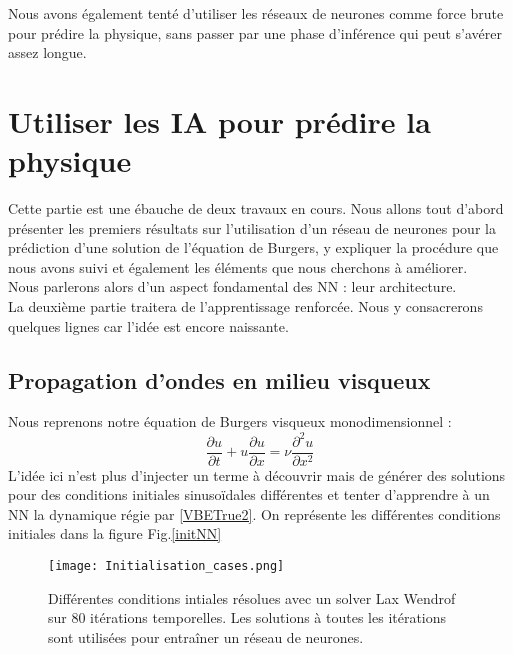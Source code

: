 \documentclass[a4paper,12pt]{article}
\newcommand\bk{\color{black}}
\newcommand\brick{\color{brick}}
\newcommand\navy{\color{navy}}
\numberwithin{equation}{section} %
\begin{document}
\noindent Nous avons également tenté d'utiliser les réseaux de neurones comme force brute pour prédire la physique, sans passer par une phase d'inférence qui peut s'avérer assez longue.
\navy \section{Utiliser les IA pour prédire la physique} \bk \label{NNdirect}
\noindent Cette partie est une ébauche de deux travaux en cours. Nous allons tout d'abord présenter les premiers résultats sur l'utilisation d'un réseau de neurones pour la prédiction d'une solution de l'équation de Burgers, y expliquer la procédure que nous avons suivi et également les éléments que nous cherchons à améliorer. \\
Nous parlerons alors d'un aspect fondamental des NN : leur architecture.\\
La deuxième partie traitera de l'apprentissage renforcée. Nous y consacrerons quelques lignes car l'idée est encore naissante.
\brick \subsection{Propagation d'ondes en milieu visqueux}\bk
\noindent Nous reprenons notre équation de Burgers visqueux monodimensionnel : 
\begin{equation}
\frac{\partial u}{\partial t} + u \frac{\partial u}{\partial x} = \nu\frac{\partial^2 u}{\partial x^2}  \label{VBETrue2} \tag{VBE}
\end{equation}
L'idée ici n'est plus d'injecter un terme à découvrir mais de générer des solutions pour des conditions initiales sinusoïdales différentes et tenter d'apprendre à un NN la dynamique régie par \eqref{VBETrue2}. On représente les différentes conditions initiales dans la figure Fig.\eqref{initNN}

\begin{figure}[!ht]
\centering
\vspace{-5mm}
\texttt{[image: Initialisation\_cases.png]}
\caption{\small{Différentes conditions intiales résolues avec un solver Lax Wendrof sur 80 itérations temporelles. Les solutions à toutes les itérations sont utilisées pour entraîner un réseau de neurones.}}
\label{initNN}
\end{figure}
\end{document}

